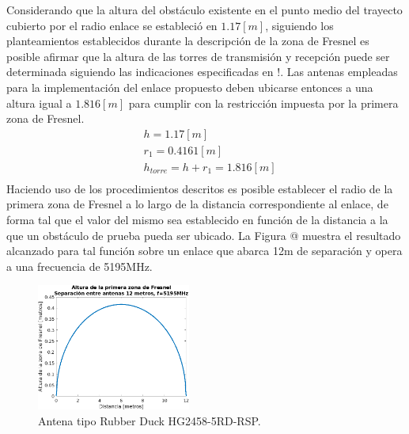 \documentclass[conference]{IEEEtran}
\begin{document}
Considerando que la altura del obstáculo existente en el punto medio del trayecto cubierto por el radio enlace se estableció en $1.17[m]$, siguiendo 
los planteamientos establecidos durante la descripción de la zona de Fresnel es posible afirmar que la altura de las torres de transmisión y recepción 
puede ser determinada siguiendo las indicaciones especificadas en !. Las antenas empleadas para la implementación del enlace propuesto deben ubicarse entonces
a una altura igual a $1.816[m]$ para cumplir con la restricción impuesta por la primera zona de Fresnel.
\begin{equation}
    \label{eq:Eq3}
    \begin{aligned}
        &h =1.17[m]\\
        &r_1 = 0.4161[m]\\
        &h_{torre} = h+r_{1}=1.816[m]\\
    \end{aligned}
\end{equation}
Haciendo uso de los procedimientos descritos es posible establecer el radio de la primera zona de Fresnel a lo
largo de la distancia correspondiente al enlace, de forma tal que el valor del mismo sea establecido en función 
de la distancia a la que un obstáculo de prueba pueda ser ubicado. La Figura @ muestra el resultado alcanzado para 
tal función sobre un enlace que abarca 12m de separación y opera a una frecuencia de 5195MHz.
\begin{figure}
    \centering
          \includegraphics[width=0.45\textwidth]{Altura_Fresnel.png}
        \caption{Antena tipo Rubber Duck HG2458-5RD-RSP.
        }
        \label{fig:Altura_Fresnel}
\end{figure}
\end{document}

